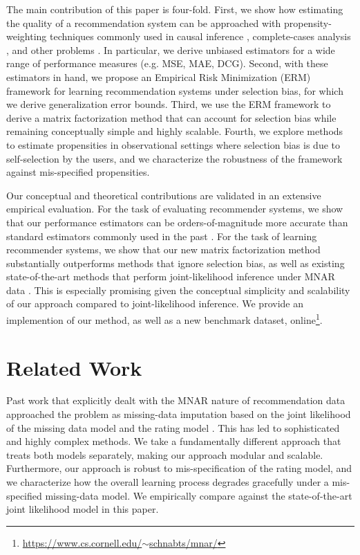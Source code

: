 \documentclass{article}
\begin{document}
The main contribution of this paper is four-fold. First, we show how estimating the quality of a recommendation system can be approached with propensity-weighting techniques commonly used in causal inference \cite{Imbens/Rubin/15}, complete-cases analysis \cite{rubin2002mnar}, and other problems \cite{Cortes/etal/08,Bickel/etal/09,Sugiyama/Kawanabe/12}. In particular, we derive unbiased estimators for a wide range of performance measures (e.g. MSE, MAE, DCG). Second, with these estimators in hand, we propose an Empirical Risk Minimization (ERM) framework for learning recommendation systems under selection bias, for which we derive generalization error bounds. Third, we use the ERM framework to derive a matrix factorization method that can account for selection bias while remaining conceptually simple and highly scalable. Fourth, we explore methods to estimate propensities in observational settings where selection bias is due to self-selection by the users, and we characterize the robustness of the framework against mis-specified propensities.

Our conceptual and theoretical contributions are validated in an extensive empirical evaluation. For the task of evaluating recommender systems, we show that our performance estimators can be orders-of-magnitude more accurate than standard estimators commonly used in the past \cite{Bell/etal/07}. For the task of learning recommender systems, we show that our new matrix factorization method substantially outperforms methods that ignore selection bias, as well as existing state-of-the-art methods that perform joint-likelihood inference under MNAR data \cite{HL}. This is especially promising given the conceptual simplicity and scalability of our approach compared to joint-likelihood inference. We provide an implemention of our method, as well as a new benchmark dataset, online\footnote{\href{https://www.cs.cornell.edu/~schnabts/mnar/}{https://www.cs.cornell.edu/$\sim$schnabts/mnar/}}.

\section{Related Work}
Past work that explicitly dealt with the MNAR nature of recommendation data approached the problem as missing-data imputation based on the joint likelihood of the missing data model and the rating model \cite{Marlin07collaborativefiltering,Marlin/Zemel/09,HL}. This has led to sophisticated and highly complex methods. We take a fundamentally different approach that treats both models separately, making our approach modular and scalable.
Furthermore, our approach is robust to mis-specification of the rating model, and we characterize how the overall learning process degrades gracefully under a mis-specified missing-data model. We empirically compare against the state-of-the-art joint likelihood model \cite{HL} in this paper.
\end{document}
